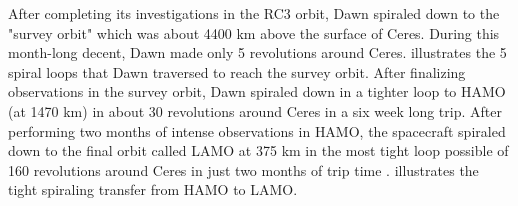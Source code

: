 After completing its investigations in the \gls{RC3} orbit, Dawn spiraled down to the "survey orbit" which was about 4400 km above the surface of Ceres. During this month-long decent, Dawn made only 5 revolutions around Ceres.  illustrates the 5 spiral loops that Dawn traversed to reach the survey orbit. After finalizing observations in the survey orbit, Dawn spiraled down in a tighter loop to \gls{HAMO} (at 1470 km) in about 30 revolutions around Ceres in a six week long trip. After performing two months of intense observations in \gls{HAMO}, the spacecraft spiraled down to the final orbit called \gls{LAMO} at 375 km in the most tight loop possible of 160 revolutions around Ceres in just two months of trip time  \cite{dawnblog2}.  illustrates the tight spiraling transfer from \gls{HAMO} to \gls{LAMO}.

